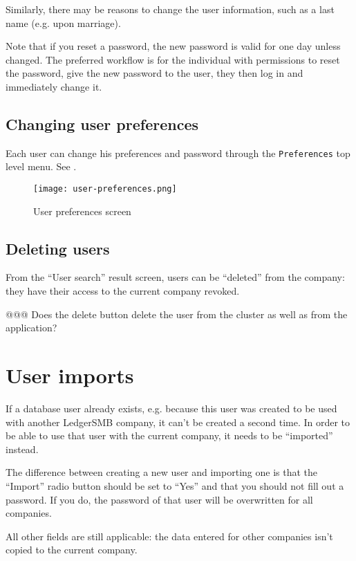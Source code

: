Similarly, there may be reasons to change the user information, such as a last name
(e.g. upon marriage).

Note that if you reset a password, the new password is valid for one day unless
changed.  The preferred workflow is for the individual with permissions to reset
the password, give the new password to the user, they then log in and
immediately change it.

\subsection{Changing user preferences}

Each user can change his preferences and password through the \texttt{Preferences}
top level menu. See .

\begin{figure}[h]
\centering
\texttt{[image: user-preferences.png]}
\caption{User preferences screen}
\label{fig:user-preferences}
\end{figure}


\subsection{Deleting users}

From the ``User search'' result screen, users can be ``deleted'' from the company:
they have their access to the current company revoked.

@@@ Does the delete button delete the user from the cluster as well as from the application? %


\section{User imports}
\label{sec:UserImports}

If a database user already exists, e.g. because this user was created to be used
with another LedgerSMB company, it can't be created a second time. In order to be
able to use that user with the current company, it needs to be ``imported'' instead.

The difference between creating a new user and importing one is that the ``Import''
radio button should be set to ``Yes'' and that you should not fill out a password.
If you do, the password of that user will be overwritten for all companies.

All other fields are still applicable: the data entered for other companies isn't
copied to the current company.


